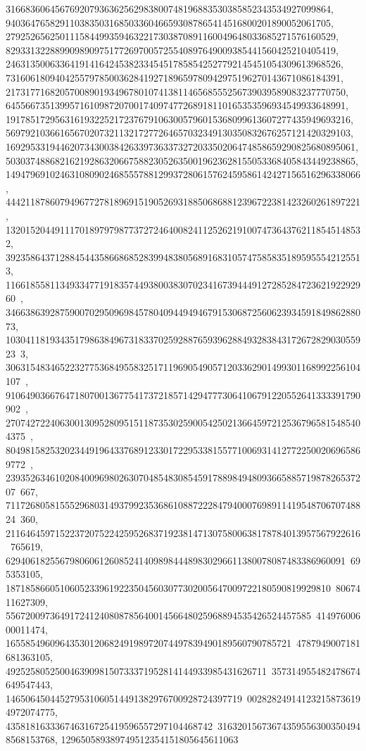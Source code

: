 {{{   316683606456769207936362562983800748196883530385852343534927099864, 
   940364765829110383503168503360466593087865414516800201890052061705, 
   2792526562501115844993594632217303870891160049648033685271576160529, 
   8293313228899098909751772697005725540897649009385441560425210405419, 
   24631350063364191416424538233454517858542527792145451054309613968526, 
   73160618094042557978500362841927189659780942975196270143671086184391, 
   217317716820570089019349678010741381146568555256739039589083237770750, 
   645566735139957161098720700174097477268918110165353596934549933648991, 
   1917851729563161932252172376791063005796015368099613607277435949693216, 
   5697921036616567020732113217277264657032349130350832676257121420329103, 
   16929533194462073430038426339736337327203350206474858659290825680895061, 
   50303748868216219286320667588230526350019623628155053368405843449238865, 
   149479691024631080902468555788129937280615762459586142427156516296338066, 
   444211878607949677278189691519052693188506868812396722381423260261897221, 
   1320152044911170189797987737272464008241125262191007473643762118545148532, 
   3923586437128845443586686852839948380568916831057475858351895955542125513, 
   11661855811349334771918357449380038307023416739444912728528472362192292960\
, 34663863928759007029509698457804094494946791530687256062393459184986288073, 
   10304118193435179863849673183370259288765939628849328384317267282903055923\
3, 
   306315483465223277536849558325171196905490571203362901499301168992256104107\
, 
   910649036676471807001367754173721857142947773064106791220552641333391790902\
, 
   2707427224063001309528095151187353025900542502136645972125367965815485404375\
, 
   8049815825320234491964337689123301722953381557710069314127722500206965869772\
, 
   23935263461020840096980263070485483085459178898494809366588571987826537207\
667, 
   71172680581555296803149379923536861088722284794000769891141954870670748824\
360, 211646459715223720752242595268371923814713075800638178784013957567922616\
765619, 629406182556798060612608524140989844489830296611380078087483386960091\
695353105, 187185866051060523396192235045603077302005647009722180590819929810\
8067411627309, 55672009736491724124080878564001456648025968894535426524457585\
41497600600011474, 1655854960964353012068249198972074497839490189560790785721\
4787949007181681363105, 49252580525004639098150733371952814144933985431626711\
357314955482478674649547443, 146506450445279531060514491382976700928724397719\
002828249141232158736194972074775, 435818163336746316725419596557297104468742\
316320156736743595563003504948568153768, 129650589389749512354151805645611063\
}}}
